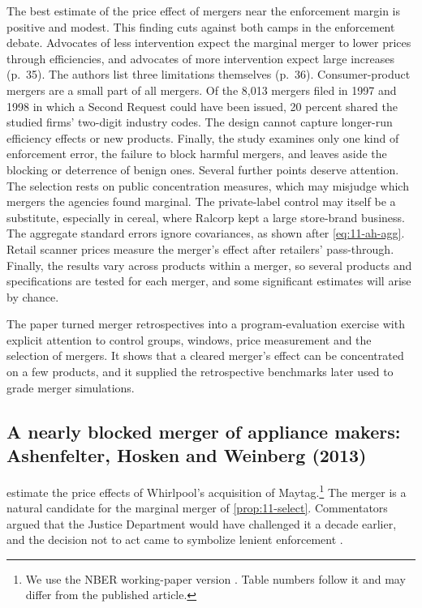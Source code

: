 The best estimate of the price effect of mergers near the enforcement
margin is positive and modest. This finding cuts against both camps in the enforcement debate. Advocates of less
intervention expect the marginal merger to lower prices through efficiencies, and advocates of more intervention
expect large increases (p.~35). The authors list three limitations themselves (p.~36). Consumer-product mergers are a
small part of all mergers. Of the 8,013 mergers filed in 1997 and 1998 in which a Second Request could have been
issued, 20 percent shared the studied firms' two-digit industry codes. The design cannot capture longer-run efficiency effects or new products. Finally, the study examines
only one kind of enforcement error, the failure to block harmful mergers, and leaves aside the blocking or
deterrence of benign ones. Several further points deserve attention. The selection rests on public concentration measures, which
may misjudge which mergers the agencies found marginal. The private-label control may itself be a substitute,
especially in cereal, where Ralcorp kept a large store-brand business. The aggregate standard errors ignore
covariances, as shown after \eqref{eq:11-ah-agg}. Retail scanner prices measure the merger's effect after
retailers' pass-through. Finally, the results vary across products within a merger, so several products and
specifications are tested for each merger, and some significant estimates will arise by chance.

 The paper turned merger retrospectives into a program-evaluation exercise with explicit
attention to control groups, windows, price measurement and the selection of mergers. It shows that a cleared
merger's effect can be concentrated on a few products, and it supplied the retrospective benchmarks later used to
grade merger simulations.

\subsection{A nearly blocked merger of appliance makers: Ashenfelter, Hosken and Weinberg (2013)}\label{sec:11-maytag}

 \citet{AshenfelterHoskenWeinberg2013} estimate the price effects of Whirlpool's acquisition of
Maytag.\footnote{We use the NBER working-paper version \citep{AshenfelterHoskenWeinberg2011}. Table numbers
follow it and may differ from the published article.} The merger is a natural candidate for the marginal merger
of \cref{prop:11-select}. Commentators argued that the Justice Department would have challenged it a decade
earlier, and the decision not to act came to symbolize lenient enforcement \citep{BakerShapiro2008}.

